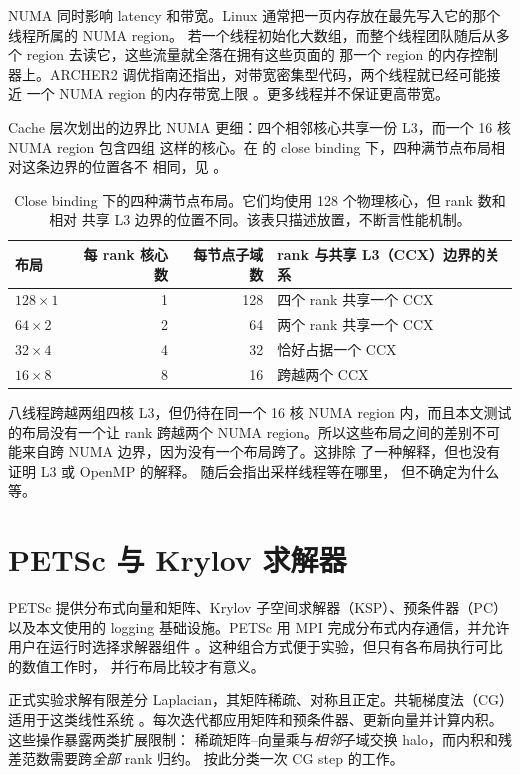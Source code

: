 \documentclass[11pt,a4paper,oneside]{report}
\begin{document}
NUMA 同时影响 latency 和带宽。Linux 通常把一页内存放在最先写入它的那个线程所属的 NUMA region。
若一个线程初始化大数组，而整个线程团队随后从多个 region 去读它，这些流量就全落在拥有这些页面的
那一个 region 的内存控制器上。ARCHER2 调优指南还指出，对带宽密集型代码，两个线程就已经可能接近
一个 NUMA region 的内存带宽上限 \cite{archer2_tuning}。更多线程并不保证更高带宽。

Cache 层次划出的边界比 NUMA 更细：四个相邻核心共享一份 L3，而一个 16 核 NUMA region 包含四组
这样的核心。在  的 close binding 下，四种满节点布局相对这条边界的位置各不
相同，见 。

\begin{table}[htbp]
  \centering
  \caption{Close binding 下的四种满节点布局。它们均使用 128 个物理核心，但 rank 数和相对
  共享 L3 边界的位置不同。该表只描述放置，不断言性能机制。}
  \label{tab:layouts}
  \begin{tabular}{lrrl}
    \toprule
    布局 & 每 rank 核心数 & 每节点子域数 & rank 与共享 L3（CCX）边界的关系 \\
    \midrule
    $128\times1$ & 1 & 128 & 四个 rank 共享一个 CCX \\
    $64\times2$  & 2 &  64 & 两个 rank 共享一个 CCX \\
    $32\times4$  & 4 &  32 & 恰好占据一个 CCX \\
    $16\times8$  & 8 &  16 & 跨越两个 CCX \\
    \bottomrule
  \end{tabular}
\end{table}

八线程跨越两组四核 L3，但仍待在同一个 16 核 NUMA region 内，而且本文测试的布局没有一个让 rank
跨越两个 NUMA region。所以这些布局之间的差别不可能来自跨 NUMA 边界，因为没有一个布局跨了。这排除
了一种解释，但也没有证明 L3 或 OpenMP 的解释。 随后会指出采样线程等在哪里，
但不确定为什么等。

\section{PETSc 与 Krylov 求解器}
\label{sec:petsc-krylov}
PETSc 提供分布式向量和矩阵、Krylov 子空间求解器（KSP）、预条件器（PC）以及本文使用的 logging
基础设施。PETSc 用 MPI 完成分布式内存通信，并允许用户在运行时选择求解器组件
\cite{petsc_manual_324,petsc1997}。这种组合方式便于实验，但只有各布局执行可比的数值工作时，
并行布局比较才有意义。

正式实验求解有限差分 Laplacian，其矩阵稀疏、对称且正定。共轭梯度法（CG）适用于这类线性系统
\cite{hestenes1952cg}。每次迭代都应用矩阵和预条件器、更新向量并计算内积。这些操作暴露两类扩展限制：
稀疏矩阵--向量乘与\emph{相邻}子域交换 halo，而内积和残差范数需要跨\emph{全部} rank 归约。
 按此分类一次 CG step 的工作。
\end{document}
